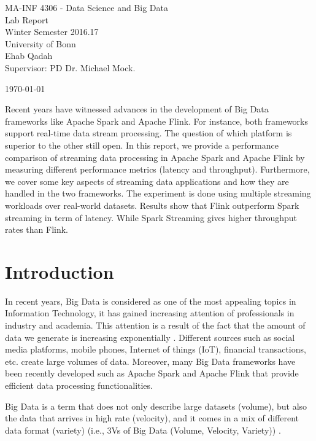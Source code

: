 \documentclass[]{article}
\begin{document}
\begin{flushleft}

\vspace{4pt}

\centering
 MA-INF 4306 - Data Science and Big Data \\
 Lab Report\\
 
   Winter Semester 2016.17\\

		 University of Bonn\\


\vspace{6pt}
\centering
 Ehab Qadah\\
 Supervisor: PD Dr. Michael Mock.
 \vspace{4pt}
 
 \today
\end{flushleft}


\begin{abstract}

\end{abstract}
Recent years have witnessed advances in the  development of Big Data frameworks like Apache Spark and Apache Flink. For instance, both frameworks support real-time data 
stream processing. The question of which platform is superior to the other still open. 
In this report, we provide a performance comparison of streaming data processing in Apache Spark and Apache Flink by measuring different performance metrics (latency and throughput). Furthermore, we cover some key aspects of streaming data applications and how they are handled in the two frameworks. The experiment is done using multiple streaming workloads over real-world datasets. Results show that Flink outperform Spark streaming in term of latency. While Spark Streaming gives higher throughput rates than Flink. 
\section{Introduction}

\par In recent years, Big Data is considered as one of the most appealing topics in Information Technology, it has gained increasing attention of professionals in industry and academia. This attention is a result of the fact that the amount of data we generate is increasing exponentially \cite{idc}.  Different sources such as  social media platforms, mobile phones, Internet of things (IoT), financial transactions, etc.  create large volumes of data.  Moreover, many Big Data frameworks have been recently developed such as Apache Spark and Apache Flink that provide efficient data processing functionalities.
 \par Big Data is a term that does not only describe large datasets (volume), but also the data that arrives in high rate (velocity), and it comes in a mix of different data format (variety) (i.e., 3Vs of Big Data (Volume, Velocity, Variety)) \cite{svs}.
\end{document}
